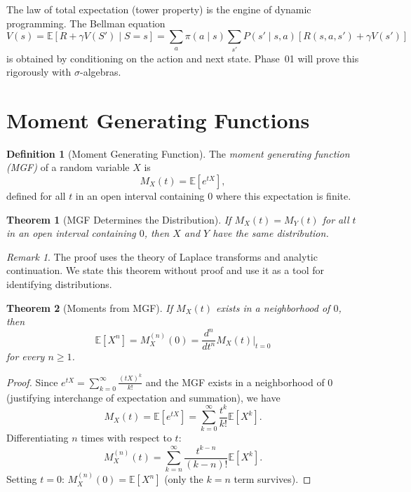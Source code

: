 \documentclass[11pt,a4paper]{article}
\theoremstyle{definition}
\newtheorem{definition}{Definition}[section]
\theoremstyle{plain}
\newtheorem{theorem}{Theorem}[section]
\theoremstyle{remark}
\newtheorem{remark}{Remark}[section]
\newcommand{\E}{\mathbb{E}}
\begin{document}
\begin{keyresult}
The law of total expectation (tower property) is the engine of dynamic programming. The
Bellman equation
\[
    V(s) = \E[R + \gamma V(S') \mid S = s]
    = \sum_a \pi(a \mid s) \sum_{s'} P(s' \mid s, a)\left[R(s,a,s') + \gamma V(s')\right]
\]
is obtained by conditioning on the action and next state. Phase~01 will prove this
rigorously with $\sigma$-algebras.
\end{keyresult}

\section{Moment Generating Functions}
\label{sec:mgf}

\begin{definition}[Moment Generating Function]
\label{def:mgf}
The \emph{moment generating function (MGF)} of a random variable $X$ is
\[
    M_X(t) = \E[e^{tX}],
\]
defined for all $t$ in an open interval containing $0$ where this expectation is finite.
\end{definition}

\begin{theorem}[MGF Determines the Distribution]
\label{thm:mgf_unique}
If $M_X(t) = M_Y(t)$ for all $t$ in an open interval containing $0$, then $X$ and $Y$
have the same distribution.
\end{theorem}

\begin{remark}
The proof uses the theory of Laplace transforms and analytic continuation. We state this
theorem without proof and use it as a tool for identifying distributions.
\end{remark}

\begin{theorem}[Moments from MGF]
\label{thm:mgf_moments}
If $M_X(t)$ exists in a neighborhood of $0$, then
\[
    \E[X^n] = M_X^{(n)}(0) = \frac{d^n}{dt^n} M_X(t)\bigg|_{t=0}
\]
for every $n \geq 1$.
\end{theorem}

\begin{proof}
Since $e^{tX} = \sum_{k=0}^\infty \frac{(tX)^k}{k!}$ and the MGF exists in a neighborhood
of $0$ (justifying interchange of expectation and summation), we have
\[
    M_X(t) = \E[e^{tX}] = \sum_{k=0}^\infty \frac{t^k}{k!}\E[X^k].
\]
Differentiating $n$ times with respect to $t$:
\[
    M_X^{(n)}(t) = \sum_{k=n}^\infty \frac{t^{k-n}}{(k-n)!}\E[X^k].
\]
Setting $t = 0$: $M_X^{(n)}(0) = \E[X^n]$ (only the $k = n$ term survives).
\end{proof}
\end{document}
